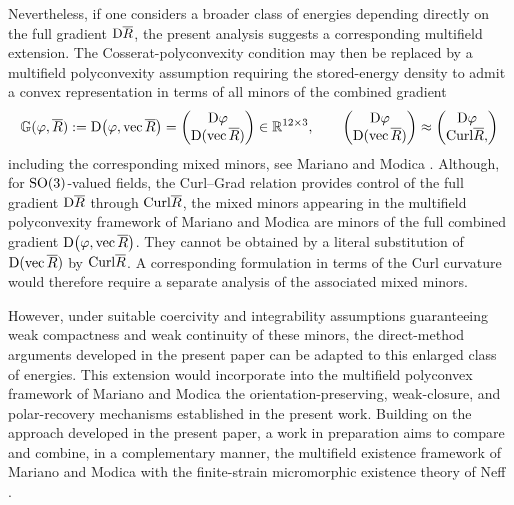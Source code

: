 \documentclass[11pt]{article}
\newcommand{\Curl}{{\rm Curl}}
\begin{document}
 Nevertheless, if one considers a broader class of energies depending
directly on the full gradient ${\rm D} \overline R$, the present analysis suggests
a corresponding multifield extension. The Cosserat-polyconvexity
condition may then be replaced by a multifield polyconvexity assumption
requiring the stored-energy density to admit a convex representation
in terms of all minors of the combined gradient
\[
\mathbb G(\varphi, \overline R)
:=
{\rm D}\bigl(\varphi,\operatorname{vec} \overline R\bigr)
=
\begin{pmatrix}
{\rm D}\varphi\\
{\rm D}(\operatorname{vec} \overline R)
\end{pmatrix}
\in\mathbb R^{12\times3},\qquad 
\begin{pmatrix}
{\rm D}\varphi\\
{\rm D}(\operatorname{vec} \overline R)
\end{pmatrix}\approx
\begin{pmatrix}
{\rm D}\varphi\\
\Curl \overline R,
\end{pmatrix}
\]
including the corresponding mixed minors, see Mariano and Modica \cite{Mariano08a}. 
Although, for ${\rm SO}(3)$-valued fields, the Curl--Grad relation
provides control of the full gradient ${\rm D}\overline R$ through
$\Curl\overline R$, the mixed minors appearing in the multifield
polyconvexity framework of Mariano and Modica are minors of the full
combined gradient
$
{\rm D}\bigl(\varphi,\operatorname{vec}\overline R\bigr)
$. 
They cannot be obtained by a literal substitution of
${\rm D}(\operatorname{vec}\overline R)$ by $\Curl\overline R$.
A corresponding formulation in terms of the Curl curvature would
therefore require a separate analysis of the associated mixed minors.


However, under suitable coercivity
and integrability assumptions guaranteeing weak compactness and weak
continuity of these minors, the direct-method arguments developed in the present paper
can be adapted to this enlarged class of energies.
This extension would incorporate into the multifield polyconvex framework of Mariano and Modica \cite{Mariano08a} the orientation-preserving, weak-closure, and polar-recovery mechanisms established in the present work. 
Building on the approach developed in the present paper, a work in preparation aims to compare and combine, in a complementary manner, the multifield existence framework of Mariano and Modica \cite{Mariano08a} with the finite-strain micromorphic existence theory of Neff \cite{Neff_Habil04,NeffMicromorphic2006}.  
\end{document}
